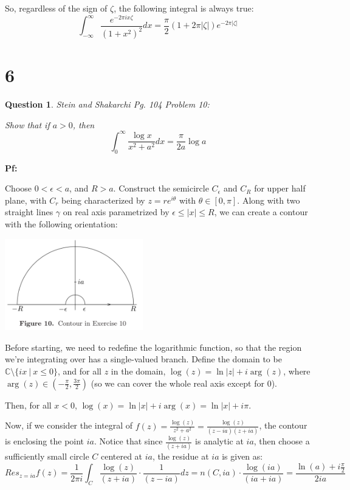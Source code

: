 \documentclass{article}
\newtheorem{question}{Question}
\begin{document}
So, regardless of the sign of $\zeta$, the following integral is always true:
$$\int_{-\infty}^{\infty}\frac{e^{-2\pi ix\zeta}}{(1+x^2)^2}dx = \frac{\pi}{2}(1+2\pi|\zeta|)e^{-2\pi|\zeta|}$$

\break

\section*{6}
\begin{myBox}[]{}
    \begin{question}
        Stein and Shakarchi Pg. 104 Problem 10:

        Show that if $a>0$, then
        $$\int_{0}^{\infty}\frac{\log x}{x^2+a^2}dx = \frac{\pi}{2a}\log a$$
    \end{question}
\end{myBox}

\textbf{Pf:}

Choose $0<\epsilon<a$, and $R>a$. Construct the semicircle $C_\epsilon$ and $C_R$ for upper half plane, with $C_r$ being characterized by $z=re^{i\theta}$ with $\theta\in[0,\pi]$.
Along with two straight lines $\gamma$ on real axis parametrized by $\epsilon\leq |x|\leq R$, we can create a contour with the following orientation:

\begin{center}
    \includegraphics*[width = 60mm]{complex problem 6.png}
\end{center}

Before starting, we need to redefine the logarithmic function, so that the region we're integrating over has a single-valued branch.
Define the domain to be $\mathbb{C}\setminus\{ix\ |\ x\leq 0\}$, and for all $z$ in the domain, $\log(z)=\ln|z|+i\arg(z)$, where $\arg(z)\in (-\frac{\pi}{2},\frac{3\pi}{2})$ (so we can cover the whole real axis except for $0$).

Then, for all $x<0$, $\log(x)=\ln|x|+i\arg(x)=\ln|x|+i\pi$.

\hfil

Now, if we consider the integral of $f(z)=\frac{\log(z)}{z^2+a^2}=\frac{\log(z)}{(z-ia)(z+ia)}$, the contour is enclosing the point $ia$. 
Notice that since $\frac{\log(z)}{(z+ia)}$ is analytic at $ia$, then choose a sufficiently small circle $C$ centered at $ia$, the residue at $ia$ is given as:
$$Res_{z=ia}f(z) = \frac{1}{2\pi i}\int_{C}\frac{\log(z)}{(z+ia)}\cdot\frac{1}{(z-ia)}dz = n(C,ia)\cdot \frac{\log(ia)}{(ia+ia)} = \frac{\ln(a)+i\frac{\pi}{2}}{2ia}$$
\end{document}
